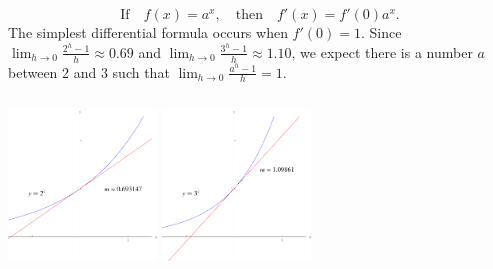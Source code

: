 \begin{frame}
\[
\text{If}\quad  f(x) = a^x, \quad \text{then}\quad f'(x) = f'(0)a^x .
\]
The simplest differential formula occurs when $f'(0) = 1$.  Since $\lim_{h\rightarrow 0}\frac{2^h-1}{h}\approx 0.69$ and $\lim_{h\rightarrow 0}\frac{3^h-1}{h}\approx 1.10$, we expect there is a number $a$ between 2 and 3 such that $\lim_{h\rightarrow 0}\frac{a^h-1}{h} = 1$.  

\begin{columns}
\includegraphics[height=4cm]{exponential-functions/pictures/exp-tangent-two.pdf}%
%
\includegraphics[height=4cm]{exponential-functions/pictures/exp-tangent-three.pdf}%
\end{columns}
\end{frame}
